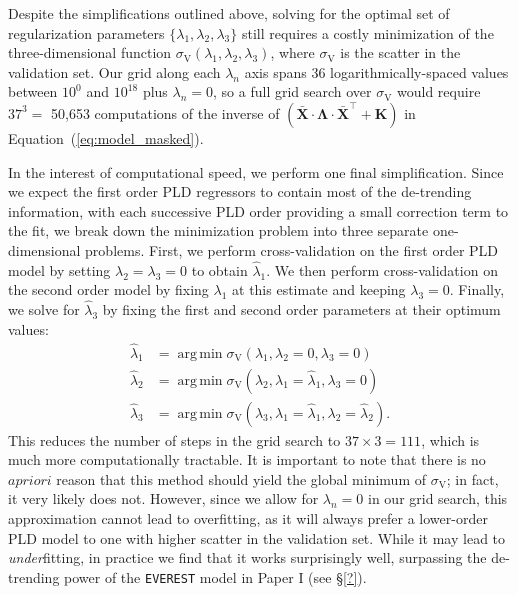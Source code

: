\documentclass[]{emulateapj}
\DeclareMathOperator*{\argmin}{arg\,min}
\begin{document}
Despite the simplifications outlined above,
solving for the optimal set of regularization parameters $\{ \lambda_1, \lambda_2, \lambda_3 \}$
still requires a costly minimization of the three-dimensional function 
$\sigma_\mathrm{V}(\lambda_1, \lambda_2, \lambda_3)$, where
$\sigma_\mathrm{V}$ is the scatter in the validation set. Our grid along each $\lambda_n$ axis
spans 36 logarithmically-spaced values between $10^{0}$ and $10^{18}$ plus $\lambda_n = 0$, so a full grid search over 
$\sigma_\mathrm{V}$ would require $37^3 =$ 50,653 computations of the inverse of
$\left(\mathbf{\bar{X}} \cdot \mathbf{\Lambda} \cdot \mathbf{\bar{X}}^\top + \mathbf{K}\right)$
in Equation~(\ref{eq:model_masked}). 

In the interest of computational speed, we perform one final simplification. Since we
expect the first order PLD regressors to contain most of the de-trending information,
with each successive PLD order providing a small correction term to the fit, we break
down the minimization problem into three separate one-dimensional problems.
First, we perform cross-validation on the first order PLD model by setting $\lambda_2 = \lambda_3 = 0$
to obtain $\hat{\lambda}_1$. We then perform cross-validation on the second order model
by fixing $\lambda_1$ at this estimate and keeping $\lambda_3 = 0$. Finally, we solve
for $\hat{\lambda}_3$ by fixing the first and second order parameters at their optimum
values:
%
\begin{align}
\hat{\lambda}_1 &= \argmin \sigma_\mathrm{V}(\lambda_1, \lambda_2 = 0,               \lambda_3 = 0) \nonumber\\
\hat{\lambda}_2 &= \argmin \sigma_\mathrm{V}(\lambda_2, \lambda_1 = \hat{\lambda}_1, \lambda_3 = 0) \nonumber\\
\hat{\lambda}_3 &= \argmin \sigma_\mathrm{V}(\lambda_3, \lambda_1 = \hat{\lambda}_1, \lambda_2 = \hat{\lambda}_2).
\end{align}
%
This reduces the number of steps in the grid search to $37\times 3 = 111$, which is much
more computationally tractable. It is important to note that there is no $a priori$ reason
that this method should yield the global minimum of $\sigma_\mathrm{V}$; in fact, it very
likely does not. However, since we allow for $\lambda_n = 0$ in our grid search, this approximation
cannot lead to overfitting, as it will always prefer a lower-order PLD model to one
with higher scatter in the validation set. While it may lead to \emph{under}fitting,
in practice we find that it works surprisingly well,
surpassing the de-trending power of the \texttt{EVEREST} model in Paper I (see \S\ref{?}).
\pagebreak


\end{document}
